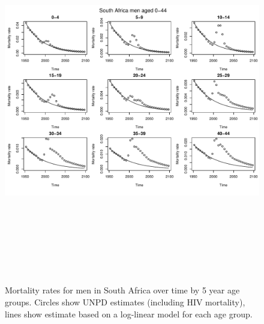\documentclass{article}
\begin{document}
\begin{figure}
\includegraphics[width=16cm,height=16cm]{EstimatingRatesFromUNPD-MortalitySAMen1} 

\caption{Mortality rates for men in South Africa over time by 5 year age groups. Circles show UNPD estimates (including HIV mortality), lines show estimate based on a log-linear model for each age group.}
\label{MortalitySAmen1}
\end{figure}
\end{document}
